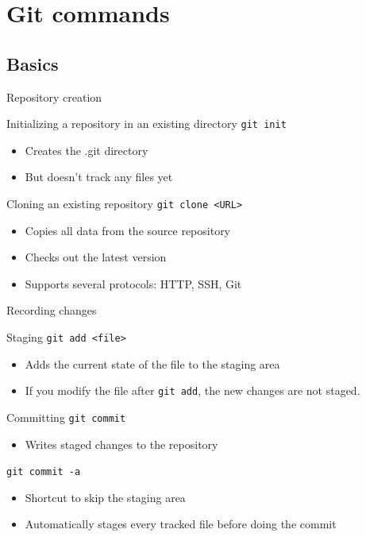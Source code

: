 \documentclass{beamer}
\begin{document}
\section{Git commands}

\subsection{Basics}

\begin{frame}{Repository creation}
  \begin{block}{Initializing a repository in an existing directory}
    \texttt{git init}
    \begin{itemize}
    \item Creates the .git directory
    \item But doesn't track any files yet
    \end{itemize}
  \end{block}
  \begin{block}{Cloning an existing repository}
    \texttt{git clone <URL>}
    \begin{itemize}
    \item Copies all data from the source repository
    \item Checks out the latest version
    \item Supports several protocols: HTTP, SSH, Git
    \end{itemize}
  \end{block}
\end{frame}

\begin{frame}{Recording changes}
  \begin{block}{Staging}
    \texttt{git add <file>}
    \begin{itemize}
    \item Adds the current state of the file to the staging area
    \item If you modify the file after \texttt{git add}, the \alert{new changes are not staged}.
    \end{itemize}
  \end{block}
  \begin{block}{Committing}
    \texttt{git commit}
    \begin{itemize}
    \item Writes staged changes to the repository
    \end{itemize}
    \texttt{git commit -a}
    \begin{itemize}
    \item Shortcut to skip the staging area
    \item Automatically stages every tracked file before doing the commit
    \end{itemize}
  \end{block}
\end{frame}
\end{document}
